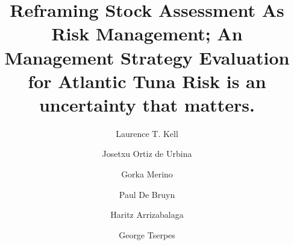 \documentclass[%
nonumbib,      %
%
]{nrc1}                          %
\begin{document}





\title{Reframing Stock Assessment As Risk Management; An Management Strategy Evaluation for Atlantic Tuna
Risk is an uncertainty that matters.}

\author{Laurence T. Kell}        
\address{ICCAT Secretariat, C/Coraz\'{o}n de Mar\'{\i}a, 8. 28002 Madrid, Spain; ~Laurie.Kell@iccat.int; ~Phone: +34 914 165 600 ~Fax: +34 914 152 612.}
        
\author{Josetxu Ortiz de Urbina} 
\address{{Instituto Espa\~nol de Oceanograf\'{\i}a IEO- CO M\'{a}laga, Pto. Pesquero s/n, 29640 Fuengirola (M\'{a}laga), Spain; ~urbina@ma.ieo.es; ~Phone: +34 952 19 71 24 ~Fax: +34 952 46 38 08.}}

\author{Gorka Merino}            
\address{{AZTI-Tecnalia, Herrera Kaia Portualdea, 20110, Pasaia, Spain; ~gmerino@azti.es; ~Phone: +34 667 174 456 ~Fax: +34 94 657 25 55.}}

\author{Paul De Bruyn}           
\address{{ICCAT Secretariat, C/Coraz\'{o}n de Mar\'{\i}a, 8. 28002 Madrid, Spain.}}

\author{Haritz Arrizabalaga}     
\address{{AZTI-Tecnalia, Herrera Kaia Portualdea, 20110, Pasaia, Spain; ~gmerino@azti.es; ~Phone: +34 667 174 456 ~Fax: +34 94 657 25 55.}}

\author{George Tserpes}          
\address{{Hellenic Centre for Marine Research (HCMR), Institute of Marine biological Resources, P.O. Box 2214, 71003 Poros, Heraklion, Greece, tel: +30 2810 337851, fax: +30 2810 337820, e-mail: gtserpes@her.hcmr.gr}}



\end{document}
